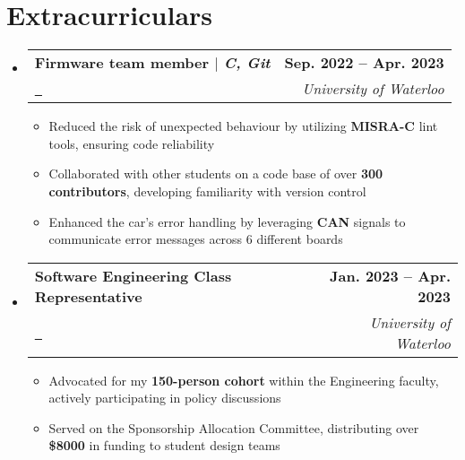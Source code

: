 \documentclass[letterpaper,11pt]{article}
\makeatletter
\newcommand{\resumeItem}[1]{
  \item\small{
    {#1 \vspace{-2pt}}
  }
}
\newcommand{\resumeSubheading}[4]{
  \vspace{-2pt}\item
    \begin{tabular*}{1.0\textwidth}[t]{l@{\extracolsep{\fill}}r}
      \textbf{#1} & \textbf{\small #2} \\
      \textit{\small#3} & \textit{\small #4} \\
    \end{tabular*}\vspace{-7pt}
}
\newcommand{\resumeSubHeadingListStart}{\begin{itemize}[leftmargin=0.0in, label={}]}
\newcommand{\resumeSubHeadingListEnd}{\end{itemize}}
\newcommand{\resumeItemListStart}{\begin{itemize}}
\newcommand{\resumeItemListEnd}{\end{itemize}\vspace{-5pt}}
\newcommand{\brokenUL}[1]{%
  \uline{\phantom{#1}}%
  \llap{\contour{white}{#1}}%
}
\makeatother
\begin{document}
\section{Extracurriculars}
    \resumeSubHeadingListStart
        \resumeSubheading
        {Firmware team member $|$ \textnormal{\normalem\emph{C, Git}}}
        {Sep. 2022 -- Apr. 2023}
        {\href{https://waterlooformulaelectric.com}{\raisebox{-0.2\height}\faExternalLink\ \brokenUL{Formula Electric Design Team}}}
        {University of Waterloo}
            \resumeItemListStart
                \resumeItem{Reduced the risk of unexpected behaviour by utilizing \textbf{MISRA-C} lint tools, ensuring code reliability}
                \resumeItem{Collaborated with other students on a code base of over \textbf{300 contributors}, developing familiarity with version control}
                \resumeItem{Enhanced the car's error handling by leveraging \textbf{CAN} signals to communicate error messages across 6 different boards}
            \resumeItemListEnd
        \resumeSubheading
        {Software Engineering Class Representative}
        {Jan. 2023 -- Apr. 2023}
        {\href{https://www.engsoc.uwaterloo.ca}{\raisebox{-0.2\height}\faExternalLink\ \brokenUL{Engineering Society}}}
        {University of Waterloo}
            \resumeItemListStart
                \resumeItem{Advocated for my \textbf{150-person cohort} within the Engineering faculty, actively participating in policy discussions}
                \resumeItem{Served on the Sponsorship Allocation Committee, distributing over \textbf{\$8000} in funding to student design teams}
            \resumeItemListEnd
    \resumeSubHeadingListEnd
\end{document}
